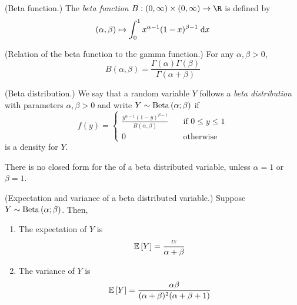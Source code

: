 \documentclass[11pt]{article}
\begin{document}
\begin{defn}{(Beta function.)}
    The \emph{beta function} $B : (0, \infty) \times (0, \infty) \to \R$
    is defined by
    \begin{equation*}
        (\alpha, \beta)
        \mapsto
        \int_0^1 x^{\alpha - 1} (1-x)^{\beta - 1} \;\mathrm{d} x
    \end{equation*}
\end{defn}

\begin{thm}{(Relation of the beta function to the gamma function.)}
    For any $\alpha, \beta > 0$,
    \begin{equation}
        \label{eq:beta-gamma-relation}
        B(\alpha, \beta)
        = \frac{\Gamma(\alpha) \Gamma(\beta)}{\Gamma(\alpha + \beta)}
    \end{equation}
\end{thm}

\omittedproof

\begin{defn}{(Beta distribution.)}
    We say that a random variable $Y$ follows a \emph{beta distribution} with
    parameters $\alpha, \beta > 0$ and write $Y \sim \operatorname{Beta}\left(\alpha;\beta\right)$
    if
    \begin{equation}
        \label{eq:beta-distribution-pdf}
        f(y) = \begin{cases}
            \frac{y^{\alpha - 1} (1-y)^{\beta - 1}}{B(\alpha, \beta)}
                &\quad\text{if } 0 \leq y \leq 1 \\
            0   &\quad\text{otherwise}
        \end{cases}
    \end{equation}
    is a density for $Y$.
\end{defn}

\begin{rem}
    There is no closed form for the \cdf{} of a beta distributed variable,
    unless $\alpha = 1$ or $\beta = 1$.
\end{rem}

\begin{thm}{(Expectation and variance of a beta distributed variable.)}
    Suppose $Y \sim \operatorname{Beta}\left(\alpha;\beta\right)$.
    Then,
    \begin{enumerate}
        \item
            The expectation of $Y$ is
            \begin{equation}
                \label{eq:expectation-beta}
                \operatorname{\mathbb{E}}{\left[Y\right]} = \frac{\alpha}{\alpha + \beta}
            \end{equation}
        \item
            The variance of $Y$ is
            \begin{equation}
                \label{eq:variance-beta}
                \operatorname{\mathbb{E}}{\left[Y\right]}
                = \frac{\alpha \beta}{(\alpha + \beta)^2 (\alpha + \beta + 1)}
            \end{equation}
    \end{enumerate}
\end{thm}
\end{document}
